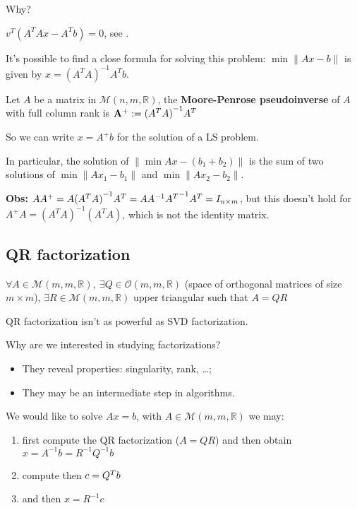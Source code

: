 \documentclass[ComputationalMathematics.tex]{subfiles}
\begin{document}
Why?

$v^T({A}^{T}Ax - {A}^{T}b) = 0$, see .


It's possible to find a close formula for solving this problem: $\min\|Ax-b\|$ is given by $x={({A}^{T}A)}^{-1}{A}^{T}b$.

\begin{definition}
  Let $A$ be a matrix in $\mathcal{M}(n, m, \mathds{R})$, the \textbf{Moore-Penrose pseudoinverse} of $A$ with full column rank is ${\bf {A}^{+}} := {({A}^{T}A)}^{-1}{A}^{T}$
\end{definition}

So we can write $x={A}^{+}b$ for the solution of a LS problem.

In particular, the solution of $\|\min Ax - ({b}_{1} + {b}_{2})\|$ is the sum of two solutions of $\min \| A{x}_{1} -b_{1} \|$ and  $\min \| A{x}_{2} -b_{2} \|$.

\textbf{Obs:} $A{A}^{+} = A {({A}^{T}A)}^{-1} {A}^{T} = A {A}^{-1} {{A}^{T}}^{-1} {A}^{T} = I_{n \times m}$, but this doesn't hold for ${A}^{+}A = {({A}^{T}A)}^{-1}({A}^{T}A)$, which is not the identity matrix.

\subsection{QR factorization}

\begin{theorem}
  $\forall A \in \mathcal{M}(m, m, \mathds{R}),~ \exists  Q \in \mathcal{O}(m, m, \mathds{R})$ (space of orthogonal matrices of size $m\times m$), $\exists R \in \mathcal{M}(m, m, \mathds{R})$ upper triangular such that $A=QR$
\end{theorem}

QR factorization isn't as powerful as SVD factorization.

Why are we interested in studying factorizations?

\begin{itemize}
  \item They reveal properties: singularity, rank, \dots;
  \item They may be an intermediate step in algorithms.
\end{itemize}

\begin{example}
  We would like to solve $Ax=b$, with $A \in \mathcal{M}(m, m, \mathds{R})$ we may:

\begin{enumerate}
  \item first compute the QR factorization ($A=QR$) and then obtain 
$x={A}^{-1}b={R}^{-1}{Q}^{-1}b$
  \item compute then $c= {Q}^{T}b$
  \item and then $x={R}^{-1}c$
\end{enumerate}
\end{example}
\end{document}
